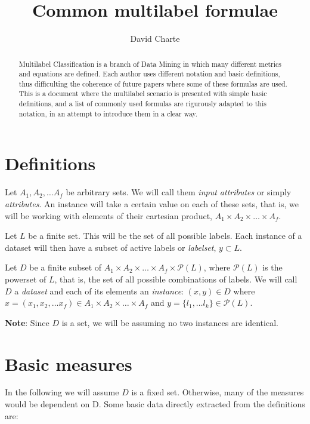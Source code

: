 \documentclass[]{article}
\title{Common multilabel formulae\\\vspace{0.5em}{\large \ldots{}under a common notation}}
\author{David Charte}
\date{}
\begin{document}
\maketitle
\begin{abstract}
Multilabel Classification is a branch of Data Mining in which many
different metrics and equations are defined. Each author uses different
notation and basic definitions, thus difficulting the coherence of
future papers where some of these formulas are used. This is a document
where the multilabel scenario is presented with simple basic
definitions, and a list of commonly used formulas are rigurously adapted
to this notation, in an attempt to introduce them in a clear way.
\end{abstract}

\section{Definitions}\label{definitions}

Let \(A_1, A_2, \dots A_f\) be arbitrary sets. We will call them
\emph{input attributes} or simply \emph{attributes}. An instance will
take a certain value on each of these sets, that is, we will be working
with elements of their cartesian product,
\(A_1\times A_2\times\dots\times A_f\).

Let \(L\) be a finite set. This will be the set of all possible labels.
Each instance of a dataset will then have a subset of active labels or
\emph{labelset}, \(y \subset L\).

Let \(D\) be a finite subset of
\(A_1\times A_2\times\dots\times A_f\times\mathcal{P}(L)\), where
\(\mathcal{P}(L)\) is the powerset of \(L\), that is, the set of all
possible combinations of labels. We will call \(D\) a \emph{dataset} and
each of its elements an \emph{instance}: \((x, y)\in D\) where
\(x=(x_1,x_2,\dots x_f)\in A_1\times A_2\times\dots\times A_f\) and
\(y=\{l_1,\dots l_k\} \in\mathcal{P}(L)\).

\textbf{Note}: Since \(D\) is a set, we will be assuming no two
instances are identical.

\section{Basic measures}\label{basic-measures}

In the following we will assume \(D\) is a fixed set. Otherwise, many of
the measures would be dependent on D. Some basic data directly extracted
from the definitions are:
\end{document}
